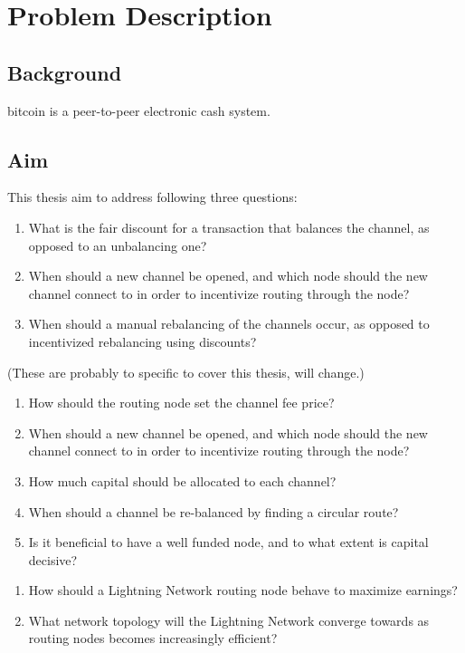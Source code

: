 \chapter{Problem Description}

\section{Background}
    \label{sec:background}

\gls{bitcoin} is a peer-to-peer electronic cash system. 

\section{Aim}
    \label{sec:aim}

This thesis aim to address following three questions:

    \begin{enumerate}
	\item What is the fair discount for a transaction that balances the channel, as
		opposed to an unbalancing one?
	\item When should a new channel be opened, and which node should the new
		channel connect to in order to incentivize routing through the node?
	\item When should a manual rebalancing of the channels occur, as opposed to
		incentivized rebalancing using discounts?
    \end{enumerate}
	(These are probably to specific to cover this thesis, will change.)
	
	 \begin{enumerate}
		\item How should the routing node set the channel fee price?
		\item When should a new channel be opened, and which node should the new
		channel connect to in order to incentivize routing through the node?
		\item How much capital should be allocated to each channel?
		\item When should a channel be re-balanced by finding a circular route?
		\item Is it beneficial to have a well funded node, and to what extent is capital decisive?
	\end{enumerate}

	\begin{enumerate}
		\item How should a \gls{Lightning Network} routing node behave to maximize earnings?
	
		\item What network topology will the \gls{Lightning Network} converge towards as routing nodes becomes increasingly efficient?
		
		
	\end{enumerate}
	
